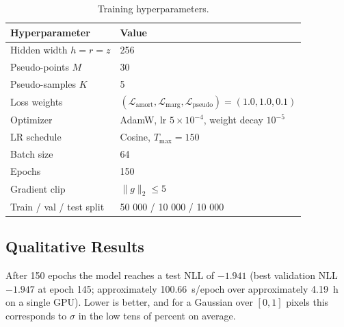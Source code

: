 \documentclass[11pt]{article}
\begin{document}
\begin{table}[H]
	\centering
	\begin{tabular}{ll}
		\toprule
		Hyperparameter           & Value                                                                                                    \\
		\midrule
		Hidden width $h = r = z$ & 256                                                                                                      \\
		Pseudo-points $M$        & 30                                                                                                       \\
		Pseudo-samples $K$       & 5                                                                                                        \\
		Loss weights             & $(\mathcal{L}_{\text{amort}}, \mathcal{L}_{\text{marg}}, \mathcal{L}_{\text{pseudo}}) = (1.0, 1.0, 0.1)$ \\
		Optimizer                & AdamW, lr $5{\times}10^{-4}$, weight decay $10^{-5}$                                                     \\
		LR schedule              & Cosine, $T_{\max} = 150$                                                                                 \\
		Batch size               & 64                                                                                                       \\
		Epochs                   & 150                                                                                                      \\
		Gradient clip            & $\|g\|_2 \le 5$                                                                                          \\
		Train / val / test split & 50 000 / 10 000 / 10 000                                                                                 \\
		\bottomrule
	\end{tabular}
	\caption{Training hyperparameters.}\label{tab:hyperparameters}
\end{table}

\subsection{Qualitative Results}

After 150 epochs the model reaches a test NLL of $-1.941$ (best
validation NLL $-1.947$ at epoch 145; approximately 100.66~s/epoch over
approximately 4.19~h on a single GPU). Lower is better, and for a
Gaussian over $[0, 1]$ pixels this corresponds to $\sigma$ in the low
tens of percent on average.
\end{document}
